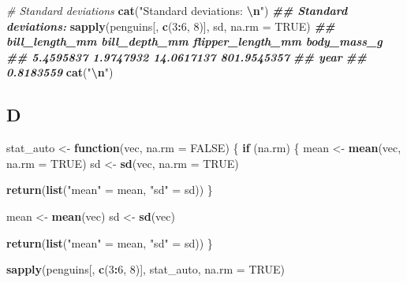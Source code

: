 \documentclass[
]{article}
\newenvironment{Shaded}{\begin{snugshade}}{\end{snugshade}}
\newcommand{\AttributeTok}[1]{\textcolor[rgb]{0.13,0.29,0.53}{#1}}
\newcommand{\CommentTok}[1]{\textcolor[rgb]{0.56,0.35,0.01}{\textit{#1}}}
\newcommand{\ConstantTok}[1]{\textcolor[rgb]{0.56,0.35,0.01}{#1}}
\newcommand{\ControlFlowTok}[1]{\textcolor[rgb]{0.13,0.29,0.53}{\textbf{#1}}}
\newcommand{\DecValTok}[1]{\textcolor[rgb]{0.00,0.00,0.81}{#1}}
\newcommand{\DocumentationTok}[1]{\textcolor[rgb]{0.56,0.35,0.01}{\textbf{\textit{#1}}}}
\newcommand{\FunctionTok}[1]{\textcolor[rgb]{0.13,0.29,0.53}{\textbf{#1}}}
\newcommand{\NormalTok}[1]{#1}
\newcommand{\OtherTok}[1]{\textcolor[rgb]{0.56,0.35,0.01}{#1}}
\newcommand{\SpecialCharTok}[1]{\textcolor[rgb]{0.81,0.36,0.00}{\textbf{#1}}}
\newcommand{\StringTok}[1]{\textcolor[rgb]{0.31,0.60,0.02}{#1}}
\begin{document}
\begin{Shaded}
\begin{Highlighting}[]
\CommentTok{\# Standard deviations}
\FunctionTok{cat}\NormalTok{(}\StringTok{"Standard deviations: }\SpecialCharTok{\textbackslash{}n}\StringTok{"}\NormalTok{)}
\DocumentationTok{\#\# Standard deviations:}
\FunctionTok{sapply}\NormalTok{(penguins[, }\FunctionTok{c}\NormalTok{(}\DecValTok{3}\SpecialCharTok{:}\DecValTok{6}\NormalTok{, }\DecValTok{8}\NormalTok{)], sd, }\AttributeTok{na.rm =} \ConstantTok{TRUE}\NormalTok{)}
\DocumentationTok{\#\#    bill\_length\_mm     bill\_depth\_mm flipper\_length\_mm       body\_mass\_g }
\DocumentationTok{\#\#         5.4595837         1.9747932        14.0617137       801.9545357 }
\DocumentationTok{\#\#              year }
\DocumentationTok{\#\#         0.8183559}
\FunctionTok{cat}\NormalTok{(}\StringTok{"}\SpecialCharTok{\textbackslash{}n}\StringTok{"}\NormalTok{)}
\end{Highlighting}
\end{Shaded}

\hypertarget{d}{%
\subsection{D}\label{d}}

\begin{Shaded}
\begin{Highlighting}[]
\NormalTok{stat\_auto }\OtherTok{\textless{}{-}} \ControlFlowTok{function}\NormalTok{(vec, }\AttributeTok{na.rm =} \ConstantTok{FALSE}\NormalTok{) \{}
  \ControlFlowTok{if}\NormalTok{ (na.rm) \{}
\NormalTok{    mean }\OtherTok{\textless{}{-}} \FunctionTok{mean}\NormalTok{(vec, }\AttributeTok{na.rm =} \ConstantTok{TRUE}\NormalTok{)}
\NormalTok{    sd }\OtherTok{\textless{}{-}} \FunctionTok{sd}\NormalTok{(vec, }\AttributeTok{na.rm =} \ConstantTok{TRUE}\NormalTok{)}

    \FunctionTok{return}\NormalTok{(}\FunctionTok{list}\NormalTok{(}\StringTok{"mean"} \OtherTok{=}\NormalTok{ mean, }\StringTok{"sd"} \OtherTok{=}\NormalTok{ sd))}
\NormalTok{  \}}

\NormalTok{  mean }\OtherTok{\textless{}{-}} \FunctionTok{mean}\NormalTok{(vec)}
\NormalTok{  sd }\OtherTok{\textless{}{-}} \FunctionTok{sd}\NormalTok{(vec)}

  \FunctionTok{return}\NormalTok{(}\FunctionTok{list}\NormalTok{(}\StringTok{"mean"} \OtherTok{=}\NormalTok{ mean, }\StringTok{"sd"} \OtherTok{=}\NormalTok{ sd))}
\NormalTok{\}}

\FunctionTok{sapply}\NormalTok{(penguins[, }\FunctionTok{c}\NormalTok{(}\DecValTok{3}\SpecialCharTok{:}\DecValTok{6}\NormalTok{, }\DecValTok{8}\NormalTok{)], stat\_auto, }\AttributeTok{na.rm =} \ConstantTok{TRUE}\NormalTok{)}
\end{Highlighting}
\end{Shaded}
\end{document}
